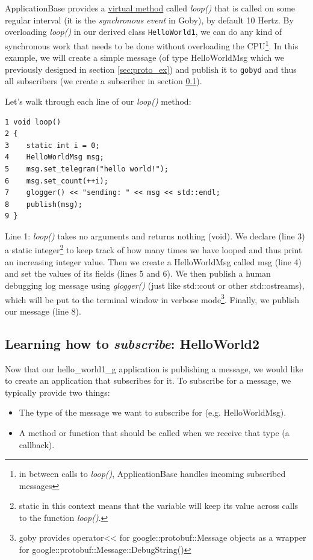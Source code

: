 \documentclass[11pt, letterpaper]{article}
\begin{document}
ApplicationBase provides a \href{http://www.cplusplus.com/doc/tutorial/polymorphism/}{virtual method} called \textit{loop()} that is called on some regular interval (it is the \textit{synchronous event} in Goby), by default 10 Hertz. By overloading \textit{loop()} in our derived class \texttt{HelloWorld1}, we can do any kind of synchronous work that needs to be done without overloading the CPU\footnote{in between calls to \textit{loop()}, ApplicationBase handles incoming subscribed messages}. In this example, we will create a simple message (of type HelloWorldMsg which we previously designed in section \ref{sec:proto_ex}) and publish it to \texttt{gobyd} and thus all subscribers (we create a subscriber in section \ref{sec:sub_ex}). 

Let's walk through each line of our \textit{loop()} method:

\begin{verbatim}
1 void loop()
2 {
3    static int i = 0;
4    HelloWorldMsg msg;
5    msg.set_telegram("hello world!");
6    msg.set_count(++i);
7    glogger() << "sending: " << msg << std::endl;
8    publish(msg);
9 }
\end{verbatim}

Line 1: \textit{loop()} takes no arguments and returns nothing (void). We declare (line 3) a static integer\footnote{static in this context means that the variable will keep its value across calls to the function \textit{loop()}.} to keep track of how many times we have looped and thus print an increasing integer value. Then we create a HelloWorldMsg called msg (line 4) and set the values of its fields (lines 5 and 6). We then publish a human debugging log message using \textit{glogger()} (just like std::cout or other std::ostreams), which will be put to the terminal window in verbose mode\footnote{goby provides operator<< for google::protobuf::Message objects as a wrapper for google::protobuf::Message::DebugString()}. Finally, we publish our message (line 8).


\subsection{Learning how to \textit{subscribe}: HelloWorld2} \label{sec:sub_ex}

Now that our hello\_world1\_g application is publishing a message, we would like to create an application that subscribes for it. To subscribe for a message, we typically provide two things:
\begin{itemize}
\item The type of the message we want to subscribe for (e.g. HelloWorldMsg).
\item A method or function that should be called when we receive that type (a callback).
\end{itemize}
\end{document}
